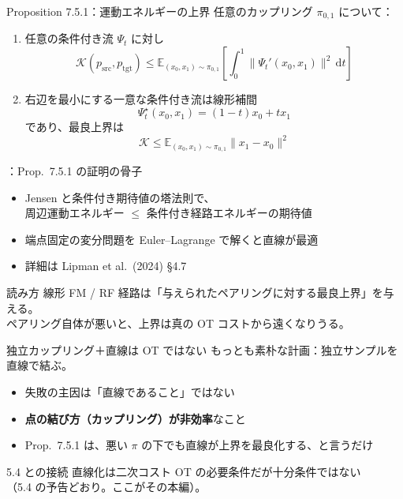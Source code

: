 \asmain
\begin{frame}{Proposition 7.5.1：運動エネルギーの上界}
    任意のカップリング $\pi_{0,1}$ について：
    \begin{enumerate}
        \item 任意の条件付き流 $\Psi_t$ に対し
        \[
            \mathcal{K}(p_{\mathrm{src}},p_{\mathrm{tgt}})
            \le
            \mathbb{E}_{(x_0,x_1)\sim\pi_{0,1}}
            \!\left[\int_0^1\|\Psi_t'(x_0,x_1)\|^2\,\mathrm{d}t\right]
        \]
        \item 右辺を最小にする一意な条件付き流は線形補間
        \[
            \Psi_t^\star(x_0,x_1)=(1-t)x_0+t x_1
        \]
        であり、最良上界は
        \[
            \mathcal{K}\le\mathbb{E}_{(x_0,x_1)\sim\pi_{0,1}}\|x_1-x_0\|^2
        \]
    \end{enumerate}
\end{frame}
\assuppl
\begin{frame}{\supplmark：Prop.\ 7.5.1 の証明の骨子}
    \begin{itemize}
        \item Jensen と条件付き期待値の塔法則で、\\
        周辺運動エネルギー $\le$ 条件付き経路エネルギーの期待値
        \item 端点固定の変分問題を Euler--Lagrange で解くと直線が最適
        \item 詳細は Lipman et al.\ (2024) §4.7
    \end{itemize}
    \begin{block}{読み方}
        線形 FM / RF 経路は「与えられたペアリングに対する最良上界」を与える。\\
        ペアリング自体が悪いと、上界は真の OT コストから遠くなりうる。
    \end{block}
\end{frame}
\asmain
\begin{frame}{独立カップリング＋直線は OT ではない}
    もっとも素朴な計画：独立サンプルを直線で結ぶ。
    \begin{itemize}
        \item 失敗の主因は「直線であること」ではない
        \item \textbf{点の結び方（カップリング）が非効率}なこと
        \item Prop.\ 7.5.1 は、悪い $\pi$ の下でも直線が上界を最良化する、と言うだけ
    \end{itemize}
    \begin{exampleblock}{5.4 との接続}
        直線化は二次コスト OT の必要条件だが十分条件ではない\\
        （5.4 の予告どおり。ここがその本編）。
    \end{exampleblock}
\end{frame}
